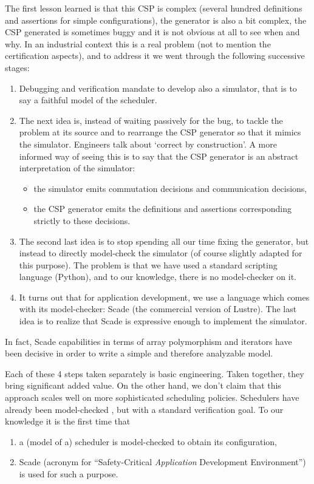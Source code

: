 \documentclass[a4paper]{article}
\begin{document}
The first lesson learned is that this CSP is complex (several hundred definitions and assertions for simple configurations), the generator is also a bit complex,
the CSP generated is sometimes buggy and it is not obvious at all to see when and why.
In an industrial context this is a real problem (not to mention the certification aspects), and to address it we went through the following successive stages:
\begin{enumerate}
\item
Debugging and verification mandate to develop also a simulator, that is to say a faithful model of the scheduler.
\item
The next idea is, instead of waiting passively for the bug, to tackle the problem at its source and to rearrange the CSP generator so that it mimics the simulator.
Engineers talk about `correct by construction'.
A more informed way of seeing this is to say that the CSP generator is an abstract interpretation of the simulator:
\begin{itemize}
\item the simulator emits commutation decisions and communication decisions,
\item the CSP generator emits the definitions and assertions corresponding strictly to these decisions.
\end{itemize}
\item
The second last idea is to stop spending all our time fixing the generator, but instead to directly model-check the simulator (of course slightly adapted for this purpose).
The problem is that we have used a standard scripting language (Python), and to our knowledge, there is no model-checker on it.
\item
It turns out that for application development, we use a language which comes with its model-checker: Scade (the commercial version of Lustre).
The last idea is to realize that Scade is expressive enough to implement the simulator.
\end{enumerate}
In fact, Scade capabilities in terms of array polymorphism and iterators have been decisive in order to write a simple and therefore analyzable model.

Each of these 4 steps taken separately is basic engineering. Taken together, they bring significant added value.
On the other hand, we don't claim that this approach scales well on more sophisticated scheduling policies.
Schedulers have already been model-checked \cite{DBLP:journals/stvr/Choi14}, but with a standard verification goal.
To our knowledge it is the first time that
\begin{enumerate}
\item a (model of a) scheduler is model-checked to obtain its configuration,
\item Scade (acronym for ``Safety-Critical \emph{Application} Development Environment'') is used for such a purpose.
\end{enumerate}
\end{document}
